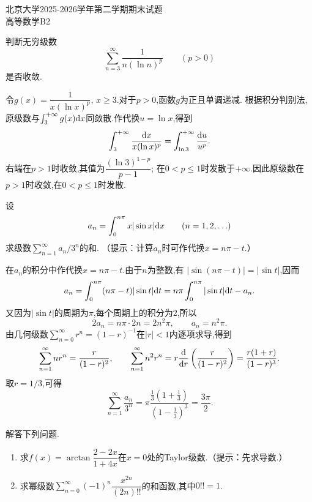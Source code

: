 \documentclass{ctexart}
\begin{document}
\pagestyle{empty}
\begin{center}\Large
北京大学2025-2026学年第二学期期末试题\\
    高等数学B2
\end{center}
\begin{problem}[1.(15\songti{分})]
判断无穷级数
\[\sum_{n=3}^{\infty}\frac1{n(\ln n)^p}\qquad(p>0)\]
是否收敛.
\end{problem}
\begin{solution}
令$g(x)=\dfrac1{x(\ln x)^p}$, $x\geqslant3$.对于$p>0$,函数$g$为正且单调递减.
根据积分判别法,原级数与$\int_3^{+\infty}g(x)\mathrm{d} x$同敛散.作代换$u=\ln x$,得到
\[\int_3^{+\infty}\frac{\mathrm{d} x}{x(\ln x)^p}
=\int_{\ln3}^{+\infty}\frac{\mathrm{d} u}{u^p}.\]
右端在$p>1$时收敛,其值为$\dfrac{(\ln3)^{1-p}}{p-1}$;
在$0<p\leqslant1$时发散于$+\infty$.因此原级数在$p>1$时收敛,在$0<p\leqslant1$时发散.
\end{solution}
\begin{problem}[2.(15\songti{分})]
设
\[a_n=\int_0^{n\pi}x|\sin x|\mathrm{d} x\qquad(n=1,2,\ldots)\]
求级数$\displaystyle\sum_{n=1}^{\infty}a_n/3^n$的和.
（提示：计算$a_n$时可作代换$x=n\pi-t$.）
\end{problem}
\begin{solution}
在$a_n$的积分中作代换$x=n\pi-t$.由于$n$为整数,有
$|\sin(n\pi-t)|=|\sin t|$,因而
\[a_n=\int_0^{n\pi}(n\pi-t)|\sin t|\mathrm{d} t
=n\pi\int_0^{n\pi}|\sin t|\mathrm{d} t-a_n.\]
又因为$|\sin t|$的周期为$\pi$,每个周期上的积分为$2$,所以
\[2a_n=n\pi\cdot2n=2n^2\pi,\qquad a_n=n^2\pi.\]
由几何级数$\sum_{n=0}^{\infty}r^n=(1-r)^{-1}$在$|r|<1$内逐项求导,得到
\[\sum_{n=1}^{\infty}nr^n=\frac{r}{(1-r)^2},\qquad
\sum_{n=1}^{\infty}n^2r^n
=r\frac{\mathrm{d}}{\mathrm{d} r}\left(\frac{r}{(1-r)^2}\right)
=\frac{r(1+r)}{(1-r)^3}.\]
取$r=1/3$,可得
\[\sum_{n=1}^{\infty}\frac{a_n}{3^n}
=\pi\frac{\frac13(1+\frac13)}{(1-\frac13)^3}=\frac{3\pi}{2}.\]
\end{solution}
\begin{problem}[3.(15\songti{分})]
解答下列问题.
\begin{enumerate}[label=\tbf{(\arabic*)},topsep=0pt,parsep=0pt,itemsep=0pt,partopsep=0pt]
\item 求$f(x)=\arctan\dfrac{2-2x}{1+4x}$在$x=0$处的Taylor级数.（提示：先求导数.）
\item 求幂级数$\displaystyle\sum_{n=0}^{\infty}(-1)^n\dfrac{x^{2n}}{(2n)!!}$的和函数,其中$0!!=1$.
\end{enumerate}
\end{problem}
\end{document}
